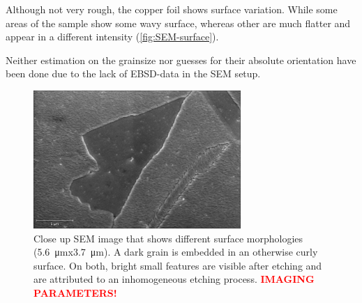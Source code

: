 Although not very rough, the copper foil shows surface variation. While some areas of the sample show some wavy surface, whereas other are much flatter and appear in a different intensity (\autoref{fig:SEM-surface}).

Neither estimation on the grainsize nor guesses for their absolute orientation have been done due to the lack of EBSD-data in the SEM setup.

\begin{figure}[] \centering
		\includegraphics[width=0.7\textwidth]{./images/Domenik_16031700.jpg}
	\caption{Close up SEM image that shows different surface morphologies (\SI{5.6}{\micro \meter}x\SI{3.7}{\micro \meter}). A dark grain is embedded in an otherwise curly surface. On both, bright small features are visible after etching and are attributed to an inhomogeneous etching process. \textcolor{red}{\textbf{IMAGING PARAMETERS!}}}
	\label{fig:SEM-surface}
\end{figure}

